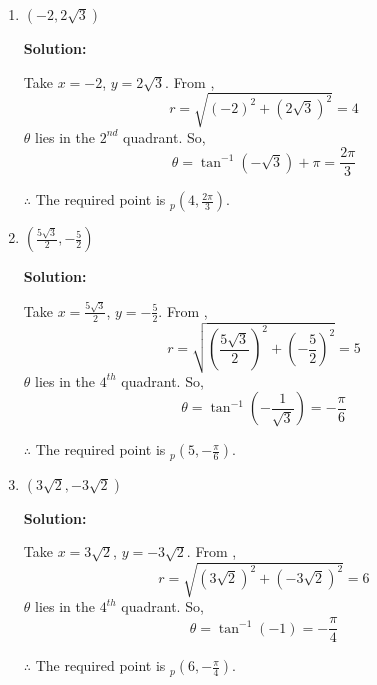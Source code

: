 \documentclass[a4paper]{article}
\begin{document}
\begin{enumerate}
    \textbf{Solution:}
    
    Take \(x = -\frac{\sqrt{2}}{2}\), \(y = \frac{\sqrt{2}}{2}\). From ,
    \[
    r = \sqrt{\left(-\frac{\sqrt{2}}{2}\right)^2 + \left(\frac{\sqrt{2}}{2}\right)^2} = 1
    \]
    \(\theta\) lies in the \(2^{nd}\) quadrant. So,
    \[
    \theta = \tan^{-1}(-1) + \pi = \frac{3\pi}{4}
    \]
    
    \(\therefore\) The required point is \(_p(1, \frac{3\pi}{4})\).

    \item \(\left(-2, 2\sqrt{3}\right)\)
    
    \textbf{Solution:}
    
    Take \(x = -2\), \(y = 2\sqrt{3}\). From ,
    \[
    r = \sqrt{(-2)^2 + (2\sqrt{3})^2} = 4
    \]
    \(\theta\) lies in the \(2^{nd}\) quadrant. So,
    \[
    \theta = \tan^{-1}\left(-\sqrt{3}\right) + \pi = \frac{2\pi}{3}
    \]
    
    \(\therefore\) The required point is \(_p(4, \frac{2\pi}{3})\).

    \item \(\left(\frac{5\sqrt{3}}{2}, -\frac{5}{2}\right)\)
    
    \textbf{Solution:}
    
    Take \(x = \frac{5\sqrt{3}}{2}\), \(y = -\frac{5}{2}\). From ,
    \[
    r = \sqrt{\left(\frac{5\sqrt{3}}{2}\right)^2 + \left(-\frac{5}{2}\right)^2} = 5
    \]
    \(\theta\) lies in the \(4^{th}\) quadrant. So,
    \[
    \theta = \tan^{-1}\left(-\frac{1}{\sqrt{3}}\right) = -\frac{\pi}{6}
    \]
    
    \(\therefore\) The required point is \(_p(5, -\frac{\pi}{6})\).

    \item \(\left(3\sqrt{2}, -3\sqrt{2}\right)\)
    
    \textbf{Solution:}
    
    Take \(x = 3\sqrt{2}\), \(y = -3\sqrt{2}\). From ,
    \[
    r = \sqrt{(3\sqrt{2})^2 + (-3\sqrt{2})^2} = 6
    \]
    \(\theta\) lies in the \(4^{th}\) quadrant. So,
    \[
    \theta = \tan^{-1}(-1) = -\frac{\pi}{4}
    \]
    
    \(\therefore\) The required point is \(_p(6, -\frac{\pi}{4})\).
\end{enumerate}
\end{document}

